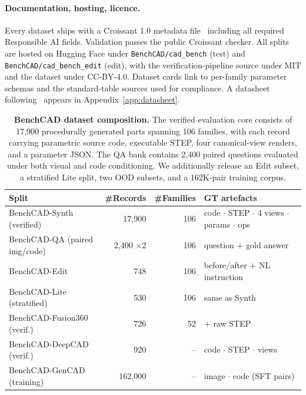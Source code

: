 \documentclass{article}
\begin{document}
\paragraph{Documentation, hosting, licence.} Every dataset ships with a Croissant 1.0 metadata file~\citep{Croissant2024} including all required Responsible AI fields. Validation passes the public Croissant checker. All splits are hosted on Hugging Face under \texttt{BenchCAD/cad\_bench} (test) and \texttt{BenchCAD/cad\_bench\_edit} (edit), with the verification-pipeline source under MIT and the dataset under CC-BY-4.0. Dataset cards link to per-family parameter schemas and the standard-table sources used for compliance. A datasheet following~\citet{rot_iou} appears in Appendix~\ref{app:datasheet}.

\begin{table}[t]
\centering
\small
\caption{\textbf{BenchCAD dataset composition.} The verified evaluation core consists of 17{,}900 procedurally generated parts spanning 106 families, with each record carrying parametric source code, executable STEP, four canonical-view renders, and a parameter JSON. The QA bank contains 2{,}400 paired questions evaluated under both visual and code conditioning. We additionally release an Edit subset, a stratified Lite split, two OOD subsets, and a 162K-pair training corpus.}
\label{tab:dataset}
\begin{tabular}{lrrl}
\toprule
Split & \#Records & \#Families & GT artefacts \\
\midrule
BenchCAD-Synth (verified)    & 17{,}900 & 106 & code $\cdot$ STEP $\cdot$ 4 views $\cdot$ params $\cdot$ ops \\
BenchCAD-QA (paired img/code)& 2{,}400 $\times 2$ & 106 & question $+$ gold answer \\
BenchCAD-Edit                & 748      & 106 & before/after $+$ NL instruction \\
BenchCAD-Lite (stratified)   & 530      & 106 & same as Synth \\
BenchCAD-Fusion360 (verif.)  & 726      & 52  & + raw STEP \\
BenchCAD-DeepCAD (verif.)    & 920      & --  & code $\cdot$ STEP $\cdot$ views \\
\midrule
BenchCAD-GenCAD (training)   & 162{,}000 & -- & image $\cdot$ code (SFT pairs) \\
\bottomrule
\end{tabular}
\end{table}
\end{document}
